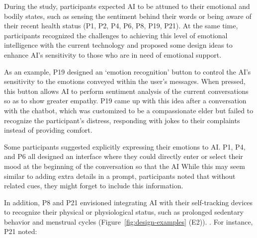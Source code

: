 During the study, participants expected AI to be attuned to their emotional and bodily states, such as sensing the sentiment behind their words or being aware of their recent health status (P1, P2, P4, P6, P8, P19, P21). At the same time, participants recognized the challenges to achieving this level of emotional intelligence with the current technology and proposed some design ideas to enhance AI's sensitivity to those who are in need of emotional support. 

As an example, P19 designed an `emotion recognition' button to control the AI's sensitivity to the emotions conveyed within the user's messages. When pressed, this button allows AI to perform sentiment analysis of the current conversations so as to show greater empathy. P19 came up with this idea after a conversation with the chatbot, which was customized to be a compassionate elder but failed to recognize the participant's distress, responding with jokes to their complaints instead of providing comfort.

Some participants suggested explicitly expressing their emotions to AI. P1, P4, and P6 all designed an interface where they could directly enter or select their mood at the beginning of the conversation so that the AI  While this may seem similar to adding extra details in a prompt, participants noted that without related cues, they might forget to include this information.


In addition, P8 and P21 envisioned integrating AI with their self-tracking devices to recognize their physical or physiological status, such as prolonged sedentary behavior and menstrual cycles (Figure~\ref{fig:design-examples} (E2)). . For instance, P21 noted:

